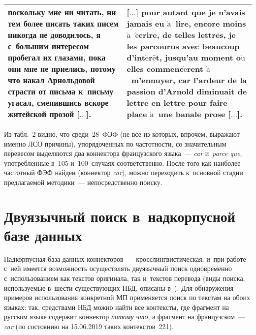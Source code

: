 \begin{multicols}{2}
\begin{table*}[b]
\begin{center}
\begin{tabular}{|p{74mm}|p{84mm}|}
\hline
[$\ldots$] \textbf{поскольку} мне ни читать, ни тем более писать таких писем никогда не 
доводилось, я с~большим интересом пробегал их глазами, пока они мне не приелись, 
\textbf{потому что} накал Арнольдовой страсти от письма к~письму угасал, сменившись 
вскоре житейской прозой [$\ldots$].&[$\ldots$] \textbf{pour autant que} je 
n'avais jamais eu $\grave{\mbox{a}}$~lire, encore moins 
$\grave{\mbox{a}}$~$\acute{\mbox{e}}$crire, de telles lettres, je les parcourus avec beaucoup 
d'int$\acute{\mbox{e}}$r$\hat{\mbox{e}}$t, jusqu'au moment o$\grave{\mbox{u}}$ elles 
commenc$\grave{\mbox{e}}$rent $\grave{\mbox{a}}$~m'ennuyer, \textbf{car} l'ardeur de la 
passion d'Arnold diminuait de lettre en lettre pour faire place $\grave{\mbox{a}}$~une banale 
prose [$\ldots$].
\newline
{}\\
\hline
\end{tabular}
\end{center}
\end{table*}

   Из табл.~2 видно, что среди~28~ФЭФ (не все из которых, впрочем, 
выражают именно ЛСО причины), упорядоченных по частотности, со 
значительным перевесом выделяются два коннектора французского языка~--- 
\textit{car} и~\textit{parce que}, употребленные в~105 и~100~случаях 
соответственно. После того как наиболее частотный ФЭФ найден (коннектор 
\textit{car}), можно переходить к~основной стадии предлагаемой  
методики~--- непосредственно поиску.

\vspace*{-9pt}

\section{Двуязычный поиск в~надкорпусной базе данных}

\vspace*{-4pt}

   
   Надкорпусная база данных коннекторов~--- кросслингвистическая, и~при 
работе с~ней имеется возможность осуществлять двуязычный поиск 
одновременно с~использованием как текстов оригинала, так и~текстов 
перевода (виды поиска, используемые в~шести существующих НБД, описаны 
в~\cite{14-in}). Для обнаружения примеров использования конкретной МП 
применяется поиск по текстам на обоих языках: так, средствами НБД можно 
\mbox{найти} все контексты, где фрагмент на русском языке содержит коннектор 
\textit{потому что}, а фрагмент на французском~--- \textit{car} (по 
состоянию на 15.06.2019 таких контекстов~221).
   

\end{multicols}
